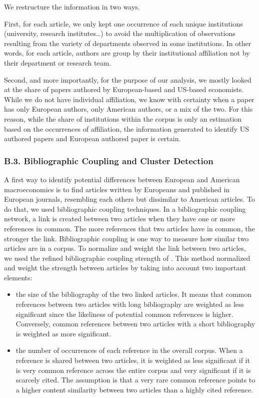 \documentclass[]{elsarticle} %
\begin{document}
We restructure the information in two ways.

First, for each article, we only kept one occurrence of each unique
institutions (university, research institutes\ldots) to avoid the
multiplication of observations resulting from the variety of departments
observed in some institutions. In other words, for each article, authors
are group by their institutional affiliation not by their department or
research team.

Second, and more importantly, for the purpose of our analysis, we mostly
looked at the share of papers authored by European-based and US-based
economists. While we do not have individual affiliation, we know with
certainty when a paper has only European authors, only American authors,
or a mix of the two. For this reason, while the share of institutions
within the corpus is only an estimation based on the occurrences of
affiliation, the information generated to identify US authored papers
and European authored paper is certain.

\hypertarget{network}{%
\subsubsection*{B.3. Bibliographic Coupling and Cluster
Detection}\label{network}}

A first way to identify potential differences between European and
American macroeconomics is to find articles written by Europeans and
published in European journals, resembling each others but dissimilar to
American articles. To do that, we used bibliographic coupling
techniques. In a bibliographic coupling network, a link is created
between two articles when they have one or more references in common.
The more references that two articles have in common, the stronger the
link. Bibliographic coupling is one way to measure how similar two
articles are in a corpus. To normalize and weight the link between two
articles, we used the refined bibliographic coupling strength of
\citet{shen2019}. This method normalized and weight the strength between
articles by taking into account two important elements:

\begin{itemize}
\item
  the size of the bibliography of the two linked articles. It means that
  common references between two articles with long bibliography are
  weighted as less significant since the likeliness of potential common
  references is higher. Conversely, common references between two
  articles with a short bibliography is weighted as more significant.
\item
  the number of occurrences of each reference in the overall corpus.
  When a reference is shared between two articles, it is weighted as
  less significant if it is very common reference across the entire
  corpus and very significant if it is scarcely cited. The assumption is
  that a very rare common reference points to a higher content
  similarity between two articles than a highly cited reference.
\end{itemize}
\end{document}
